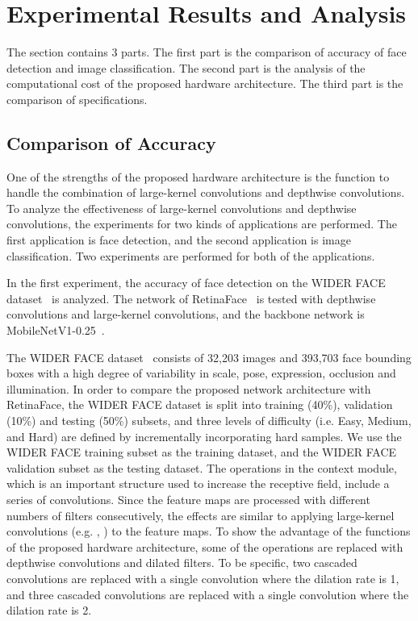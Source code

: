 \documentclass[runningheads]{llncs}
\begin{document}
\section{Experimental Results and Analysis}
\label{sec:results}

The section contains 3 parts. The first part is the comparison of accuracy of face detection and image classification. The second part is the analysis of the computational cost of the proposed hardware architecture. The third part is the comparison of specifications.



\subsection{Comparison of Accuracy}
\label{subsec:comparison}

One of the strengths of the proposed hardware architecture is the function to handle the combination of large-kernel convolutions and depthwise convolutions. To analyze the effectiveness of large-kernel convolutions and depthwise convolutions, the experiments for two kinds of applications are performed. The first application is face detection, and the second application is image classification. Two experiments are performed for both of the applications.

In the first experiment, the accuracy of face detection on the WIDER FACE dataset~\cite{Yang16} is analyzed. The network of RetinaFace~\cite{Deng19} is tested with depthwise convolutions and large-kernel convolutions, and the backbone network is MobileNetV1-0.25~\cite{Howard17}. 

The WIDER FACE dataset~\cite{Yang16} consists of 32,203 images and 393,703 face bounding boxes with a high degree of variability in scale, pose, expression, occlusion and illumination. In order to compare the proposed network architecture with RetinaFace, the WIDER FACE dataset is split into training (40\%), validation (10\%) and testing (50\%) subsets, and three levels of difficulty (i.e. Easy, Medium, and Hard) are defined by incrementally incorporating hard samples. We use the WIDER FACE training subset as the training dataset, and the WIDER FACE validation subset as the testing dataset. The operations in the context module, which is an important structure used to increase the receptive field, include a series of  convolutions. Since the feature maps are processed with different numbers of  filters consecutively, the effects are similar to applying large-kernel convolutions (e.g. , ) to the feature maps. To show the advantage of the functions of the proposed hardware architecture, some of the operations are replaced with depthwise convolutions and dilated filters. To be specific, two cascaded  convolutions are replaced with a single  convolution where the dilation rate is 1, and three cascaded  convolutions are replaced with a single  convolution where the dilation rate is 2.
\end{document}
